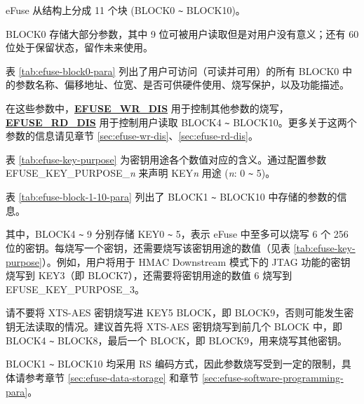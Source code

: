 \documentclass[main\_\_CN.tex]{subfiles}
\begin{document}
eFuse 从结构上分成 11 个块 (BLOCK0 \verb+~+ BLOCK10)。

BLOCK0 存储大部分参数，其中 9 位可被用户读取但是对用户没有意义；还有 60 位处于保留状态，留作未来使用。

表 \ref{tab:efuse-block0-para} 列出了用户可访问（可读并可用）的所有 BLOCK0 中的参数名称、偏移地址、位宽、是否可供硬件使用、烧写保护，以及功能描述。

在这些参数中，{\bfseries \hyperref[fielddesc:EFUSEWRDIS]{EFUSE\_WR\_DIS}} 用于控制其他参数的烧写，{\bfseries \hyperref[fielddesc:EFUSERDDIS]{EFUSE\_RD\_DIS}} 用于控制用户读取 BLOCK4 \verb+~+ BLOCK10。更多关于这两个参数的信息请见章节 \ref{sec:efuse-wr-dis}、\ref{sec:efuse-rd-dis}。

\clearpage
\begin{landscape}



\end{landscape}
\restoregeometry
\clearpage

表 \ref{tab:efuse-key-purpose} 为密钥用途各个数值对应的含义。通过配置参数 EFUSE\_KEY\_PURPOSE\_\textcolor{myred}{\it{n}} 来声明 KEY\textcolor{myred}{\it{n}} 用途 (\textcolor{myred}{\it{n}}: 0 \verb+~+ 5)。



表 \ref{tab:efuse-block-1-10-para} 列出了 BLOCK1 \verb+~+ BLOCK10 中存储的参数的信息。



其中，BLOCK4 \verb+~+ 9 分别存储 KEY0 \verb+~+ 5，表示 eFuse 中至多可以烧写 6 个 256 位的密钥。每烧写一个密钥，还需要烧写该密钥用途的数值（见表 \ref{tab:efuse-key-purpose}）。例如，用户将用于 HMAC Downstream 模式下的 JTAG 功能的密钥烧写到 KEY\textcolor{myred}{3}（即 BLOCK7），还需要将密钥用途的数值 6 烧写到 EFUSE\_KEY\_PURPOSE\_\textcolor{myred}{3}。

\begin{tiplisting}
请不要将 XTS-AES 密钥烧写进 KEY5 BLOCK，即 BLOCK9，否则可能发生密钥无法读取的情况。建议首先将 XTS-AES 密钥烧写到前几个 BLOCK 中，即 BLOCK4 \verb+~+ BLOCK8，最后一个 BLOCK，即 BLOCK9，用来烧写其他密钥。
\end{tiplisting}

BLOCK1 \verb+~+ BLOCK10 均采用 RS 编码方式，因此参数烧写受到一定的限制，具体请参考章节 \ref{sec:efuse-data-storage} 和章节 \ref{sec:efuse-software-programming-para}。
\end{document}
